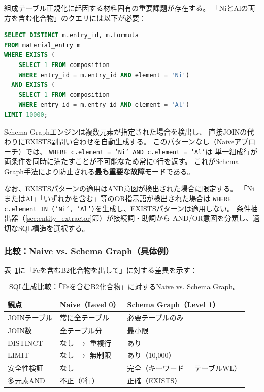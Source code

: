 \documentclass[5p,twocolumn]{elsarticle}
\begin{document}
組成テーブル正規化に起因する材料固有の重要課題が存在する。
「NiとAlの両方を含む化合物」のクエリには以下が必要：

\begin{lstlisting}[language=SQL,caption={EXISTS副問い合わせによる多元素ANDクエリ。},label=lst:exists]
SELECT DISTINCT m.entry_id, m.formula
FROM material_entry m
WHERE EXISTS (
    SELECT 1 FROM composition
    WHERE entry_id = m.entry_id AND element = 'Ni')
  AND EXISTS (
    SELECT 1 FROM composition
    WHERE entry_id = m.entry_id AND element = 'Al')
LIMIT 10000;
\end{lstlisting}

Schema Graphエンジンは複数元素が指定された場合を検出し、
直接JOINの代わりにEXISTS副問い合わせを自動生成する。
このパターンなし（Naiveアプローチ）では、
\texttt{WHERE c.element = 'Ni' AND c.element = 'Al'}は
単一組成行が両条件を同時に満たすことが不可能なため常に0行を返す。
これがSchema Graph手法により防止される\textbf{最も重要な故障モード}である。

なお、EXISTSパターンの適用はAND意図が検出された場合に限定する。
「NiまたはAl」「いずれかを含む」等のOR指示語が検出された場合は
\texttt{WHERE c.element IN ('Ni', 'Al')}を生成し、EXISTSパターンは適用しない。
条件抽出器（\ref{sec:entity_extractor}節）が接続詞・助詞から
AND/OR意図を分類し、適切なSQL構造を選択する。

\subsubsection{比較：Naive vs. Schema Graph（具体例）}

表~\ref{tab:naive_vs_sg}に「Feを含むB2化合物を出して」に対する差異を示す：

\begin{table}[htbp]
  \centering
  \caption{SQL生成比較：「Feを含むB2化合物」に対するNaive vs. Schema Graph。}
  \label{tab:naive_vs_sg}
  \small
  \begin{tabularx}{\linewidth}{lXX}
    \toprule
    観点 & Naive（Level 0） & Schema Graph（Level 1） \\
    \midrule
    JOINテーブル & 常に全テーブル & 必要テーブルのみ \\
    JOIN数 & 全テーブル分 & 最小限 \\
    DISTINCT & なし $\to$ 重複行 & あり \\
    LIMIT & なし $\to$ 無制限 & あり（10{,}000） \\
    安全性検証 & なし & 完全（キーワード + テーブルWL） \\
    多元素AND & 不正（0行） & 正確（EXISTS） \\
    \bottomrule
  \end{tabularx}
\end{table}
\end{document}
